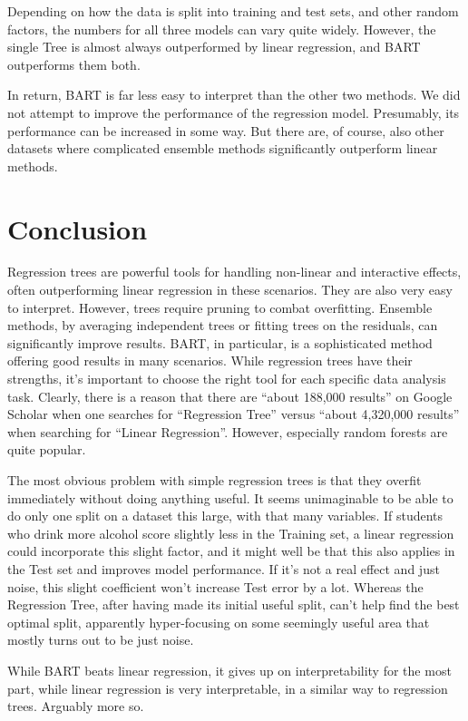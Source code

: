 \documentclass[12pt]{article}
\begin{document}
Depending on how the data is split into training and test sets, and other random factors, the numbers for all three models can vary quite widely. However, the single Tree is almost always outperformed by linear regression, and BART outperforms them both.

In return, BART is far less easy to interpret than the other two methods. We did not attempt to improve the performance of the regression model. Presumably, its performance can be increased in some way. But there are, of course, also other datasets where complicated ensemble methods significantly outperform linear methods.


\section{Conclusion}

Regression trees are powerful tools for handling non-linear and interactive effects, often outperforming linear regression in these scenarios. They are also very easy to interpret. However, trees require pruning to combat overfitting. Ensemble methods, by averaging independent trees or fitting trees on the residuals, can significantly improve results. BART, in particular, is a sophisticated method offering good results in many scenarios. While regression trees have their strengths, it's important to choose the right tool for each specific data analysis task. Clearly, there is a reason that there are ``about 188,000 results'' on Google Scholar when one searches for ``Regression Tree'' versus ``about 4,320,000 results'' when searching for ``Linear Regression''. However, especially random forests are quite popular.

The most obvious problem with simple regression trees is that they overfit immediately without doing anything useful. It seems unimaginable to be able to do only one split on a dataset this large, with that many variables. If students who drink more alcohol score slightly less in the Training set, a linear regression could incorporate this slight factor, and it might well be that this also applies in the Test set and improves model performance. If it's not a real effect and just noise, this slight coefficient won't increase Test error by a lot. Whereas the Regression Tree, after having made its initial useful split, can't help find the best optimal split, apparently hyper-focusing on some seemingly useful area that mostly turns out to be just noise.

While BART beats linear regression, it gives up on interpretability for the most part, while linear regression is very interpretable, in a similar way to regression trees. Arguably more so.
\end{document}
